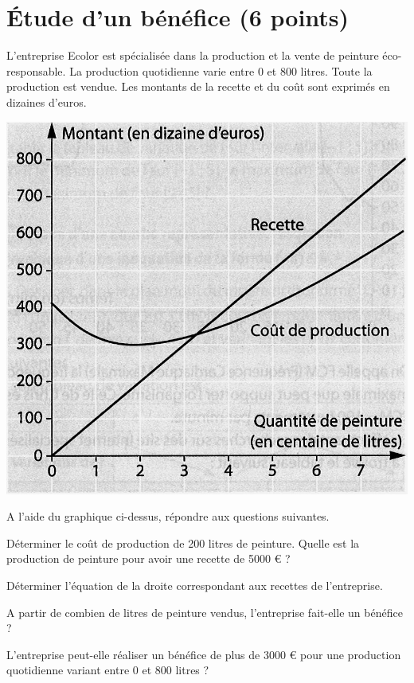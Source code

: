 \section{\'Etude d'un bénéfice (6 points)}

L'entreprise Ecolor est spécialisée dans la production et la vente de peinture éco-responsable. La production quotidienne varie entre 0 et 800 litres. Toute la production est vendue. Les montants de la recette et du coût sont exprimés en dizaines d'euros.

\begin{center}
	\includegraphics[scale=1.35]{img/graph}
\end{center}

A l'aide du graphique ci-dessus, répondre aux questions suivantes.
\begin{questions}
	\question[1] Déterminer le coût de production de 200 litres de peinture.
	\question[1] Quelle est la production de peinture pour avoir une recette de \num{5000} € ?
	
	\question[2] Déterminer l'équation de la droite correspondant aux recettes de l'entreprise.
	
	\question[1] A partir de combien de litres de peinture vendus, l'entreprise fait-elle un bénéfice ?
	
	\question[1] L'entreprise peut-elle réaliser un bénéfice de plus de 3000 € pour une production quotidienne variant entre 0 et 800 litres ?
\end{questions}